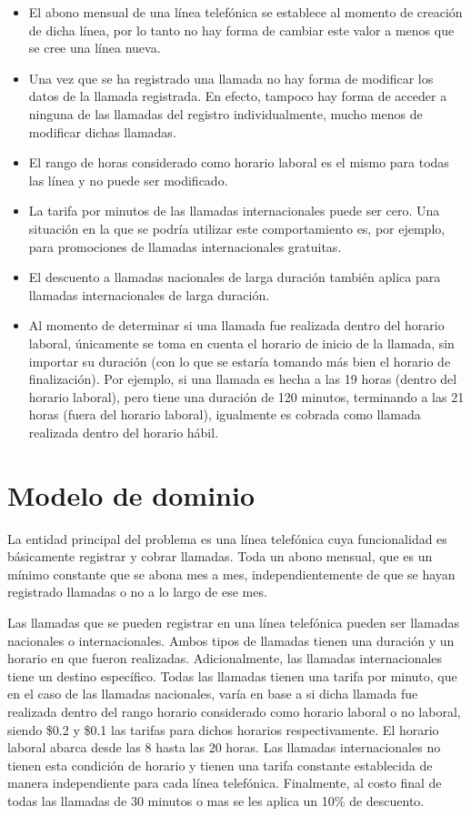 \documentclass[titlepage,a4paper]{article}
\begin{document}
\begin{itemize}
  \item El abono mensual de una línea telefónica se establece al momento de creación de dicha línea, por lo tanto no hay forma de cambiar este valor a menos que se cree una línea nueva.
  \item Una vez que se ha registrado una llamada no hay forma de modificar los datos de la llamada registrada. En efecto, tampoco hay forma de acceder a ninguna de las llamadas del registro individualmente, mucho menos de modificar dichas llamadas.
  \item El rango de horas considerado como horario laboral es el mismo para todas las línea y no puede ser modificado.
  \item La tarifa por minutos de las llamadas internacionales puede ser cero. Una situación en la que se podría utilizar este comportamiento es, por ejemplo, para promociones de llamadas internacionales gratuitas.
  \item El descuento a llamadas nacionales de larga duración también aplica para llamadas internacionales de larga duración.
  \item Al momento de determinar si una llamada fue realizada dentro del horario laboral, únicamente se toma en cuenta el horario de inicio de la llamada, sin importar su duración (con lo que se estaría tomando más bien el horario de finalización). Por ejemplo, si una llamada es hecha a las 19 horas (dentro del horario laboral), pero tiene una duración de 120 minutos, terminando a las 21 horas (fuera del horario laboral), igualmente es cobrada como llamada realizada dentro del horario hábil.
\end{itemize}



\section{Modelo de dominio}\label{sec:modelo}

La entidad principal del problema es una línea telefónica cuya funcionalidad es básicamente registrar y cobrar llamadas.
Toda un abono mensual, que es un mínimo constante que se abona mes a mes, independientemente de que se hayan registrado llamadas o no a lo largo de ese mes.

Las llamadas que se pueden registrar en una línea telefónica pueden ser llamadas nacionales o internacionales. Ambos tipos de llamadas tienen una duración y un horario en que fueron realizadas. Adicionalmente, las llamadas internacionales tiene un destino específico. Todas las llamadas tienen una tarifa por minuto, que en el caso de las llamadas nacionales, varía en base a si dicha llamada fue realizada dentro del rango horario considerado como horario laboral o no laboral, siendo \$0.2 y \$0.1 las tarifas para dichos horarios respectivamente. El horario laboral abarca desde las 8 hasta las 20 horas. Las llamadas internacionales no tienen esta condición de horario y tienen una tarifa constante establecida de manera independiente para cada línea telefónica. Finalmente, al costo final de todas las llamadas de 30 minutos o mas se les aplica un 10\% de descuento.
\end{document}

